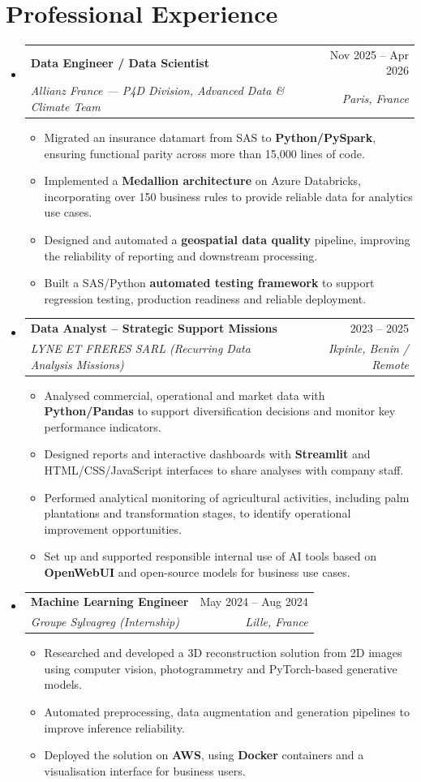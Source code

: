 \documentclass[a4paper,11pt]{article}
\makeatletter
\newcommand{\resumeItem}[1]{\item\small{{#1 \vspace{-1.5pt}}}}
\newcommand{\resumeSubheading}[4]{\vspace{1pt}\item
  \begin{tabular*}{0.97\textwidth}[t]{l@{\extracolsep{\fill}}r}
  {\color{primary}\textbf{#1}} & #2 \\
  \textit{\small#3} & \textit{\small #4} \\
  \end{tabular*}\vspace{-4pt}}
\newcommand{\resumeSubHeadingListStart}{\begin{itemize}[leftmargin=0.15in,label={}]}
\newcommand{\resumeSubHeadingListEnd}{\end{itemize}}
\newcommand{\resumeItemListStart}{\begin{itemize}[leftmargin=0.15in,label={\small\textbullet},itemsep=1.5pt,parsep=0pt,topsep=2pt,partopsep=0pt]}
\newcommand{\resumeItemListEnd}{\end{itemize}\vspace{-1pt}}
\makeatother
\begin{document}
\section{Professional Experience}
\resumeSubHeadingListStart
\resumeSubheading{Data Engineer / Data Scientist}{Nov 2025 -- Apr 2026}{Allianz France --- P4D Division, Advanced Data \& Climate Team}{Paris, France}
\resumeItemListStart
  \resumeItem{Migrated an insurance datamart from SAS to \textbf{Python/PySpark}, ensuring functional parity across more than 15,000 lines of code.}
  \resumeItem{Implemented a \textbf{Medallion architecture} on Azure Databricks, incorporating over 150 business rules to provide reliable data for analytics use cases.}
  \resumeItem{Designed and automated a \textbf{geospatial data quality} pipeline, improving the reliability of reporting and downstream processing.}
  \resumeItem{Built a SAS/Python \textbf{automated testing framework} to support regression testing, production readiness and reliable deployment.}
\resumeItemListEnd
\resumeSubheading{Data Analyst -- Strategic Support Missions}{2023 -- 2025}{LYNE ET FRERES SARL \normalfont\small(Recurring Data Analysis Missions)}{Ikpinle, Benin / Remote}
\resumeItemListStart
  \resumeItem{Analysed commercial, operational and market data with \textbf{Python/Pandas} to support diversification decisions and monitor key performance indicators.}
  \resumeItem{Designed reports and interactive dashboards with \textbf{Streamlit} and HTML/CSS/JavaScript interfaces to share analyses with company staff.}
  \resumeItem{Performed analytical monitoring of agricultural activities, including palm plantations and transformation stages, to identify operational improvement opportunities.}
  \resumeItem{Set up and supported responsible internal use of AI tools based on \textbf{OpenWebUI} and open-source models for business use cases.}
\resumeItemListEnd
\resumeSubheading{Machine Learning Engineer}{May 2024 -- Aug 2024}{Groupe Sylvagreg \normalfont\small(Internship)}{Lille, France}
\resumeItemListStart
  \resumeItem{Researched and developed a 3D reconstruction solution from 2D images using computer vision, photogrammetry and PyTorch-based generative models.}
  \resumeItem{Automated preprocessing, data augmentation and generation pipelines to improve inference reliability.}
  \resumeItem{Deployed the solution on \textbf{AWS}, using \textbf{Docker} containers and a visualisation interface for business users.}
\resumeItemListEnd
\resumeSubHeadingListEnd
\end{document}
